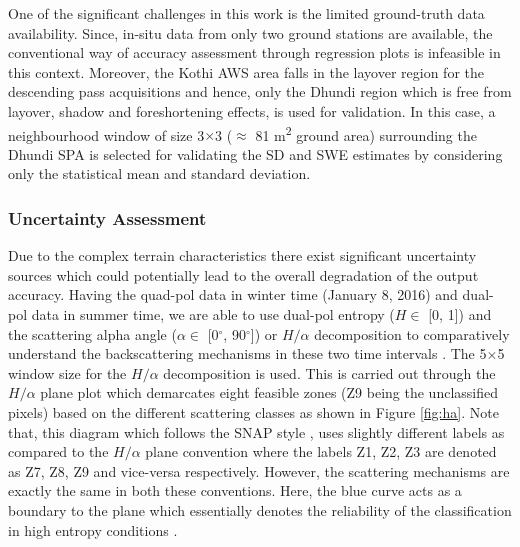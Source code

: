 \documentclass[review]{elsarticle}
\numberwithin{equation}{section}
\numberwithin{figure}{section}
\numberwithin{table}{section}
\begin{document}
One of the significant challenges in this work is the limited ground-truth data availability. Since, in-situ data from only two ground stations are available, the conventional way of accuracy assessment through regression plots \citep{Kugler2015, Leinss2014, Kumar2017} is infeasible in this context. Moreover, the Kothi AWS area falls in the layover region for the descending pass acquisitions and hence, only the Dhundi region which is free from layover, shadow and foreshortening effects, is used for validation. In this case, a neighbourhood window of size 3$\times$3 ($\approx$ 81 m\textsuperscript{2} ground area) surrounding the Dhundi SPA is selected for validating the SD and SWE estimates by considering only the statistical mean and standard deviation.

\subsubsection{Uncertainty Assessment}
\label{sssec:ua}

Due to the complex terrain characteristics there exist significant uncertainty sources which could potentially lead to the overall degradation of the output accuracy. Having the quad-pol data in winter time (January 8, 2016) and dual-pol data in summer time, we are able to use dual-pol entropy ($H \in$ [0, 1]) and the scattering alpha angle ($\alpha \in$ [0$^\circ$, 90$^\circ$]) or $H/{\alpha}$ decomposition to comparatively understand the backscattering mechanisms in these two time intervals \citep{Cloude2010, Lee2009, Singh2014}. The 5$\times$5 window size for the $H/{\alpha}$ decomposition is used. This is carried out through the $H/{\alpha}$ plane plot which demarcates eight feasible zones (Z9 being the unclassified pixels) based on the different scattering classes as shown in Figure \ref{fig:ha}. Note that, this diagram which follows the SNAP style \citep{ESA2018}, uses slightly different labels as compared to the \cite{Lee2009} $H/{\alpha}$ plane convention where the labels Z1, Z2, Z3 are denoted as Z7, Z8, Z9 and vice-versa respectively. However, the scattering mechanisms are exactly the same in both these conventions. Here, the blue curve acts as a boundary to the plane which essentially denotes the reliability of the classification in high entropy conditions \citep{Brunner2009}.
\end{document}
